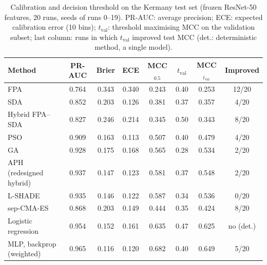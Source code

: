\begin{table}[!t]
\centering
\caption{Calibration and decision threshold on the Kermany test set (frozen ResNet-50 features, 20 runs, seeds of runs 0--19). PR-AUC: average precision; ECE: expected calibration error (10 bins); $t_\mathrm{val}$: threshold maximising MCC on the validation subset; last column: runs in which $t_\mathrm{val}$ improved test MCC (det.: deterministic method, a single model).}
\label{tab:calibration}
\footnotesize
\setlength{\tabcolsep}{3.5pt}
\begin{tabular}{lccccccc}
\toprule
Method & PR-AUC & Brier & ECE & MCC$_{0.5}$ & $t_\mathrm{val}$ & MCC$_{t_\mathrm{val}}$ & Improved \\
\midrule
FPA & 0.764 & 0.343 & 0.340 & 0.243 & 0.40 & 0.253 & 12/20 \\
SDA & 0.852 & 0.203 & 0.126 & 0.381 & 0.37 & 0.357 & 4/20 \\
Hybrid FPA--SDA & 0.827 & 0.246 & 0.214 & 0.345 & 0.50 & 0.343 & 8/20 \\
PSO & 0.909 & 0.163 & 0.113 & 0.507 & 0.40 & 0.479 & 4/20 \\
GA & 0.928 & 0.175 & 0.168 & 0.565 & 0.28 & 0.534 & 2/20 \\
APH (redesigned hybrid) & 0.937 & 0.147 & 0.123 & 0.581 & 0.37 & 0.548 & 2/20 \\
L-SHADE & 0.935 & 0.146 & 0.122 & 0.587 & 0.34 & 0.536 & 0/20 \\
sep-CMA-ES & 0.868 & 0.203 & 0.149 & 0.444 & 0.35 & 0.424 & 8/20 \\
\midrule
Logistic regression & 0.954 & 0.152 & 0.161 & 0.635 & 0.47 & 0.625 & no (det.) \\
MLP, backprop (weighted) & 0.965 & 0.116 & 0.120 & 0.682 & 0.40 & 0.649 & 5/20 \\
\bottomrule
\end{tabular}
\end{table}
